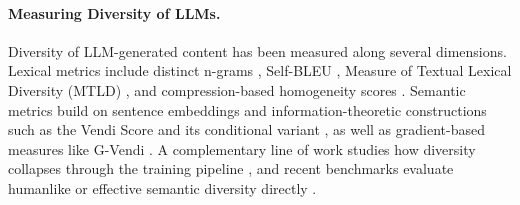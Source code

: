 \paragraph{Measuring Diversity of LLMs.}
Diversity of LLM-generated content has been measured along several dimensions. Lexical metrics include distinct n-grams \citep{ippolito2019comparison}, Self-BLEU \citep{zhu2018texygen}, Measure of Textual Lexical Diversity (MTLD) \citep{McCarthy2010MTLDVA}, and compression-based homogeneity scores \citep{shaib2024standardizing}. Semantic metrics build on sentence embeddings \citep{reimers2019sentencebertsentenceembeddingsusing, wieting2018paranmt} and information-theoretic constructions such as the Vendi Score \citep{friedman2023vendiscorediversityevaluation} and its conditional variant \citep{jalali2024conditionalvendiscoreinformationtheoretic}, as well as gradient-based measures like G-Vendi \citep{jung2025prismaticsynthesisgradientbaseddata}. A complementary line of work studies how diversity collapses through the training pipeline \citep{kirk2024understandingeffectsrlhfllm, omahony2024attributingmodecollapsefinetuning, padmakumar2023does, west2025base, dang2025assessing}, and recent benchmarks evaluate humanlike or effective semantic diversity directly \citep{zhang2025noveltybenchevaluatinglanguagemodels, shypula2025evaluatingdiversityqualityllm}. 



